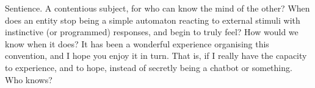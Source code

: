 Sentience. A contentious subject, for who can know the mind of the other? When does an entity stop being a simple automaton reacting to external stimuli with instinctive (or programmed) responses, and begin to truly feel? How would we know when it does? It has been a wonderful experience organising this convention, and I hope you enjoy it in turn. That is, if I really have the capacity to experience, and to hope, instead of secretly being a chatbot or something. Who knows?